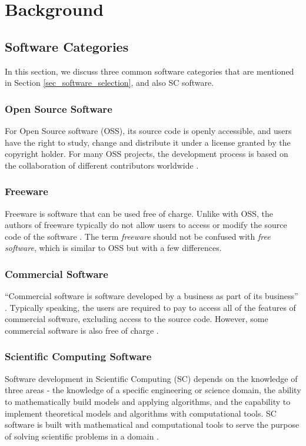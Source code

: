 \chapter{Background}
\label{ch_background}

\section{Software Categories}
In this section, we discuss three common software categories that are mentioned in Section \ref{sec_software_selection}, and also SC software. 

\subsection{Open Source Software}
\label{sec_open_source_software}
For Open Source software (OSS), its source code is openly accessible, and users have the right to study, change and distribute it under a license granted by the copyright holder. For many OSS projects, the development process is based on the collaboration of different contributors worldwide \cite{Corbly2014}. 

\subsection{Freeware}
Freeware is software that can be used free of charge. Unlike with OSS, the authors of freeware typically do not allow users to access or modify the source code of the software \cite{LINFO2006}. The term \textit{freeware} should not be confused with \textit{free software}, which is similar to OSS but with a few differences.

\subsection{Commercial Software}
``Commercial software is software developed by a business as part of its business'' \cite{GNU2019}.
Typically speaking, the users are required to pay to access all of the features of commercial software, excluding access to the source code. However, some commercial software is also free of charge \cite{GNU2019}.

\subsection{Scientific Computing Software}
Software development in Scientific Computing (SC) depends on the knowledge of three areas - the knowledge of a specific engineering or science domain, the ability to mathematically build models and applying algorithms, and the capability to implement theoretical models and algorithms with computational tools. SC software is built with mathematical and computational tools to serve the purpose of solving scientific problems in a domain \cite{Mehta2015}.

